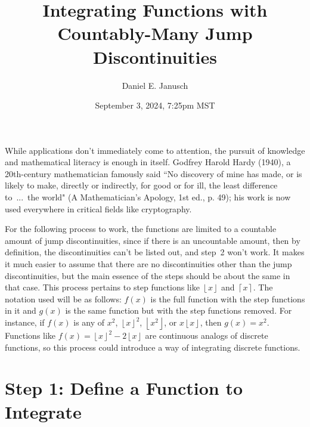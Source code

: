 \documentclass[12pt]{article}
\newcommand{\floor}[1]{\left\lfloor #1 \right\rfloor}
\newcommand{\ceil}[1]{ \left\lceil  #1 \right\rceil}
\begin{document}
{}

\title{Integrating Functions with Countably-Many Jump Discontinuities}
\author{Daniel E. Janusch}
\date{September 3, 2024, 7:25pm MST}
\maketitle

	\indent While applications don't immediately come to attention, the pursuit of knowledge and
	mathematical literacy is enough in itself. Godfrey Harold Hardy (1940), a 20th-century
	mathematician famously said ``No discovery of mine has made, or is likely to make, directly
	or indirectly, for good or for ill, the least difference to~...~the world" (A Mathematician's
	Apology, 1st ed., p. 49); his work is now used everywhere in critical fields like
	cryptography.

	\indent For the following process to work, the functions are limited to a countable amount of
	jump discontinuities, since if there is an uncountable amount, then by definition, the
	discontinuities can't be listed out, and step~2 won't work. It makes it much easier to assume
	that there are no discontinuities other than the jump discontinuities, but the main essence of
	the steps should be about the same in that case. This process pertains to step functions like
	$\floor x$ and $\ceil x$. The notation used will be as follows: $f(x)$ is the full function
	with the step functions in it and  $g(x)$ is the same function but with the step functions
	removed. For instance, if $f(x)$ is any of $x^2$, $\floor{x}^2$, $\floor{x^2}$, or
	$x\floor x$, then $g(x) = x^2$. Functions like $f(x) = \floor{x}^2 - 2\floor x$ are
	continuous analogs of discrete functions, so this process could introduce a way of integrating
	discrete functions.

{}
\section*{Step 1: Define a Function to Integrate}
\end{document}

